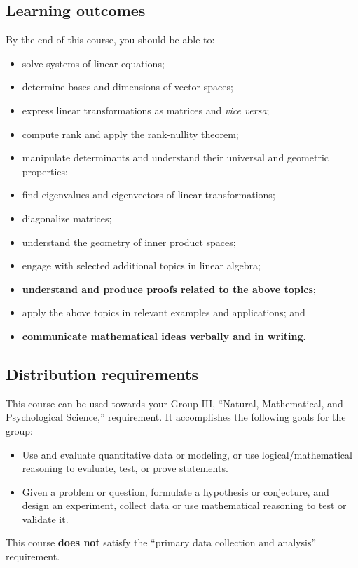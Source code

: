 \documentclass[11pt,twoside]{amsart}
\begin{document}
\subsection*{Learning outcomes}
By the end of this course, you should be able to:
\begin{itemize}
\item solve systems of linear equations;
\item determine bases and dimensions of vector spaces;
\item express linear transformations as matrices and \emph{vice versa};
\item compute rank and apply the rank-nullity theorem;
\item manipulate determinants and understand their universal and geometric properties;
\item find eigenvalues and eigenvectors of linear transformations;
\item diagonalize matrices;
\item understand the geometry of inner product spaces;
\item engage with selected additional topics in linear algebra;
\item \textbf{understand and produce proofs related to the above topics};
\item apply the above topics in relevant examples and applications; and
\item \textbf{communicate mathematical ideas verbally and in writing}.
\end{itemize}

\subsection*{Distribution requirements}
This course can be used towards your Group III, ``Natural, Mathematical, and Psychological Science,'' requirement.  It accomplishes the following goals for the group:
\begin{itemize}
\item Use and evaluate quantitative data or modeling, or use logical/mathematical reasoning to evaluate, test, or prove statements.
\item Given a problem or question, formulate a hypothesis or conjecture, and design an experiment, collect data or use mathematical reasoning to test or validate it.
\end{itemize}
This course \textbf{does not} satisfy the ``primary data collection and analysis'' requirement.
\end{document}
